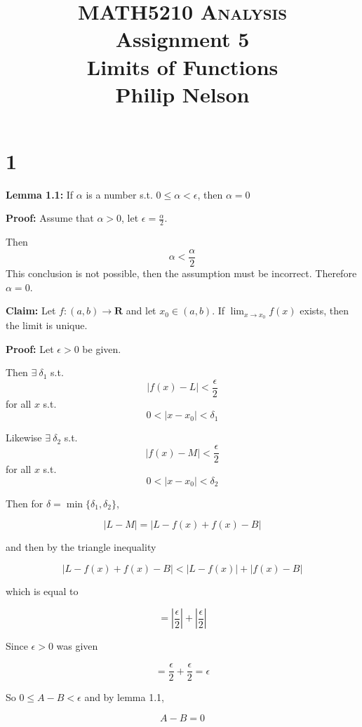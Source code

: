 \documentclass[10pt,letterpaper]{article}
\newcommand\R{\mathbf{R}}
\newcommand\ds{\displaystyle}
\begin{document}
\title{MATH5210 \textsc{Analysis}
  \\ Assignment 5
  \\ Limits of Functions
  \\ Philip Nelson
}

\date{}

\maketitle

\section*{1} 

\textbf{Lemma 1.1:} If $\alpha$ is a number s.t. $0\leq\alpha<\epsilon$, then $\alpha = 0$

\medskip

\textbf{Proof:} Assume that $\alpha > 0$, let $\epsilon = \frac{\alpha}{2}$.

Then \[\alpha < \frac{\alpha}{2}\] This conclusion is not possible, then the assumption must be incorrect. Therefore $\alpha = 0$.

\medskip

\textbf{Claim:} Let $f:(a,b)\to\R$ and let $x_0\in(a,b)$. If $\ds\lim_{x\to x_0} f(x)$ exists, then the limit is unique.

\medskip

\textbf{Proof:} Let $\epsilon > 0$ be given.

Then $\exists\ \delta_1$ s.t. \[|f(x) - L| < \frac{\epsilon}{2}\] for all $x$ s.t. \[0 < |x-x_0| < \delta_1\]

Likewise $\exists\ \delta_2$ s.t. \[|f(x) - M| < \frac{\epsilon}{2}\] for all $x$ s.t. \[0 < |x-x_0| < \delta_2\]

Then for $\delta = \min\{\delta_1, \delta_2\}$,

\[|L-M| = |L-f(x) + f(x) - B|\]

and then by the triangle inequality

\[|L-f(x) + f(x) - B| < |L - f(x)| + |f(x) - B|\]

which is equal to

\[=|\frac{\epsilon}{2}|+|\frac{\epsilon}{2}|\]

Since $\epsilon > 0$ was given

\[=\frac{\epsilon}{2}+\frac{\epsilon}{2} = \epsilon\]

So $0 \leq A-B < \epsilon$ and by lemma 1.1,

\[A-B = 0\]
\end{document}
